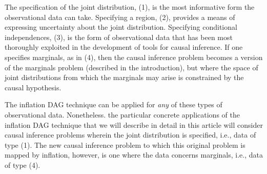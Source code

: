 The specification of the joint distribution, (1), is the most informative form the observational data can take.  Specifying a region, (2), provides a means of expressing uncertainty about the joint distribution.  Specifying conditional independences, (3), is the form of observational data that has been most thoroughly exploited in the development of tools for causal inference.   If one specifies marginals, as in (4), then the causal inference problem becomes a version of the marginals problem (described in the introduction), but where the space of joint distributions from which the marginals may arise is constrained by the causal hypothesis.  

The inflation DAG technique can be applied for {\em any} of these types of observational data.   Nonetheless. the particular concrete applications of the inflation DAG technique that we will describe in detail in this article will consider causal inference problems wherein the joint distribution is specified, i.e., data of type (1).  The new causal inference problem to which this original problem is mapped by inflation, however, is one where the data concerns marginals, i.e., data of type (4).


